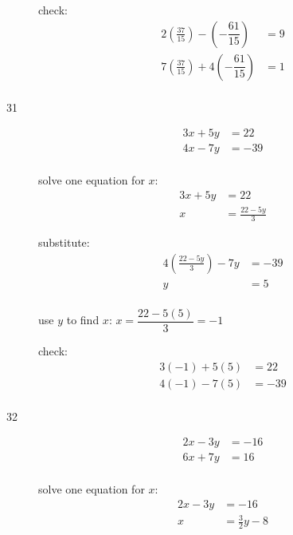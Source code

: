 \documentclass[fleqn,addpoints]{exam}
\begin{document}
\begin{description}
\vspace{0.2 cm}
\vspace{0.2 cm}

check:
\begin{align*}
  2\left( \frac{37}{15} \right) - \left( - \dfrac{61}{15} \right) &= 9 \\
  7\left( \frac{37}{15} \right) + 4\left( - \dfrac{61}{15} \right) &= 1 \\
\end{align*}

\item[31]
\begin{align*}
  3x+5y &= 22 \\
  4x - 7y &= -39 \\
\end{align*}

solve one equation for $x$:
\begin{align*}
  3x+5y &= 22 \\
  x &= \frac{22-5y}{3}
\end{align*}

substitute:
\begin{align*}
  4\left( \frac{22-5y}{3} \right) - 7y &= -39 \\
  y &= 5 \\
\end{align*}

use $y$ to find $x$: $x = \dfrac{22 - 5(5)}{3} = -1$

\vspace{0.2 cm}
\vspace{0.2 cm}

check:
\begin{align*}
  3(-1)+5(5) &= 22 \\
  4(-1) - 7(5) &= -39 \\
\end{align*}

\item[32]
\begin{align*}
  2x-3y &= -16 \\
  6x + 7y &= 16 \\
\end{align*}

solve one equation for $x$:
\begin{align*}
  2x-3y &= -16 \\
  x &= \frac{3}{2} y - 8 \\
\end{align*}


\end{description}
\end{document}
